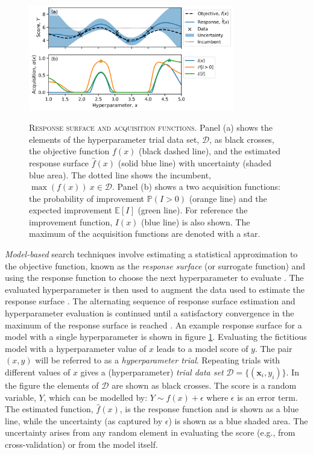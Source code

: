 \begin{figure}
    \centering
    \caption[Response surface and acquisition functions]{\textsc{Response surface and acquisition functions}. Panel (a) shows the elements of the hyperparameter trial data set, $\mathcal{D}$, as black crosses, the objective function $f(x)$ (black dashed line), and the estimated response surface $\hat{f}(x)$ (solid blue line) with uncertainty (shaded blue area). The dotted line shows the incumbent, $\max{\left(f(x)\right)}\ x\in \mathcal{D}$. Panel (b) shows a two acquisition functions: the probability of improvement $\mathbb{P}(I>0)$ (orange line) and the expected improvement $\mathbb{E}[I]$ (green line). For reference the improvement function, $I(x)$ (blue line) is also shown. The maximum of the acquisition functions are denoted with a star. }
    \includegraphics[width=0.8\textwidth]{chapters/msm_optimization/figures/response_surface_explainer.png}
    \label{fig:msm_rsm_explainer}
\end{figure}

\emph{Model-based} search techniques involve estimating a statistical approximation to the objective function, known  as the \emph{response surface} (or surrogate function) and using the response function to choose the next hyperparameter to evaluate \cite{hutterSequentialModelbasedOptimization2011}. The evaluated hyperparameter is then used to augment the data used to estimate the response surface \cite{hutterSequentialModelbasedOptimization2011}. The alternating sequence of response surface estimation and hyperparameter evaluation is continued until a satisfactory convergence in the maximum of the response surface is reached \cite{hutterSequentialModelbasedOptimization2011}. An example response surface for a model with a single hyperparameter is shown in figure \ref{fig:msm_rsm_explainer}. Evaluating the fictitious model with a hyperparameter value of $x$ leads to a model score of $y$. The pair $(x, y)$ will be referred to as a \emph{hyperparameter trial}. Repeating trials with different values of $x$ gives a (hyperparameter) \emph{trial data set}  $\mathcal{D}=\{(\mathbf{x}_{i}, y_{i})\}$. In the figure the elements of $\mathcal{D}$ are shown as black crosses. The score is a random variable, $Y$, which can be modelled by: $Y \sim f(x) + \epsilon$ where $\epsilon$ is an error term. The estimated function, $\hat{f}(x)$, is the response function and is shown as a blue line, while the uncertainty (as captured by $\epsilon$) is shown as a blue shaded area. The uncertainty arises from any random element in evaluating the score (e.g., from cross-validation) or from the model itself.  

